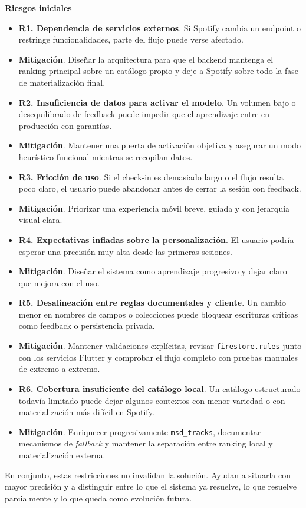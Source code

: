 \textbf{Riesgos iniciales}
\begin{itemize}
    \item \textbf{R1. Dependencia de servicios externos}. Si Spotify cambia un endpoint o restringe funcionalidades, parte del flujo puede verse afectado.
    \item \textbf{Mitigación}. Diseñar la arquitectura para que el backend mantenga el ranking principal sobre un catálogo propio y deje a Spotify sobre todo la fase de materialización final.
    \item \textbf{R2. Insuficiencia de datos para activar el modelo}. Un volumen bajo o desequilibrado de feedback puede impedir que el aprendizaje entre en producción con garantías.
    \item \textbf{Mitigación}. Mantener una puerta de activación objetiva y asegurar un modo heurístico funcional mientras se recopilan datos.
    \item \textbf{R3. Fricción de uso}. Si el check-in es demasiado largo o el flujo resulta poco claro, el usuario puede abandonar antes de cerrar la sesión con feedback.
    \item \textbf{Mitigación}. Priorizar una experiencia móvil breve, guiada y con jerarquía visual clara.
    \item \textbf{R4. Expectativas infladas sobre la personalización}. El usuario podría esperar una precisión muy alta desde las primeras sesiones.
    \item \textbf{Mitigación}. Diseñar el sistema como aprendizaje progresivo y dejar claro que mejora con el uso.
    \item \textbf{R5. Desalineación entre reglas documentales y cliente}. Un cambio menor en nombres de campos o colecciones puede bloquear escrituras críticas como feedback o persistencia privada.
    \item \textbf{Mitigación}. Mantener validaciones explícitas, revisar \texttt{firestore.rules} junto con los servicios Flutter y comprobar el flujo completo con pruebas manuales de extremo a extremo.
    \item \textbf{R6. Cobertura insuficiente del catálogo local}. Un catálogo estructurado todavía limitado puede dejar algunos contextos con menor variedad o con materialización más difícil en Spotify.
    \item \textbf{Mitigación}. Enriquecer progresivamente \texttt{msd\_tracks}, documentar mecanismos de \textit{fallback} y mantener la separación entre ranking local y materialización externa.
\end{itemize}

En conjunto, estas restricciones no invalidan la solución. Ayudan a situarla con mayor precisión y a distinguir entre lo que el sistema ya resuelve, lo que resuelve parcialmente y lo que queda como evolución futura.
